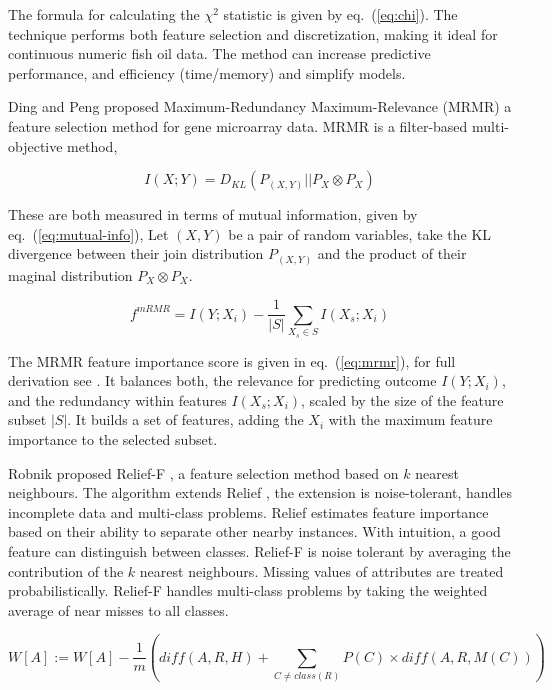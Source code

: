 \documentclass[runningheads]{llncs}
\begin{document}
The formula for calculating the $\chi^2$ statistic is given by eq.~(\ref{eq:chi}).
The technique performs both feature selection and discretization, making it ideal for continuous numeric fish oil data. 
The method can increase predictive performance, and efficiency (time/memory) and simplify models. 

Ding and Peng proposed Maximum-Redundancy Maximum-Relevance (MRMR) \cite{ding2005minimum} a feature selection method for gene microarray data. 
MRMR is a filter-based multi-objective method, 

\begin{equation}
  I(X;Y) = D_{KL}(P_{(X,Y)} || P_X \otimes P_X) 
  \label{eq:mutual-info}
\end{equation}  

These are both measured in terms of mutual information, given by eq.~(\ref{eq:mutual-info}), 
Let $(X,Y)$ be a pair of random variables, take the KL divergence \cite{kullback1951information} between their join distribution $P_{(X,Y)}$ and the product of their maginal distribution $P_X \otimes P_X$.

\begin{equation}
  f^{mRMR} = I(Y;X_i) - \frac{1}{|S|} \sum_{X_s \in S} I(X_s;X_i) 
  \label{eq:mrmr}
\end{equation}  

The MRMR feature importance score is given in eq.~(\ref{eq:mrmr}), for full derivation see \cite{liu1995chi2,zhao2019maximum}.
It balances both, the relevance for predicting outcome $I(Y;X_i)$, and the redundancy within features $I(X_s;X_i)$, scaled by the size of the feature subset $|S|$. 
It builds a set of features, adding the $X_i$ with the maximum feature importance to the selected subset.

Robnik proposed Relief-F \cite{kononenko1994estimating}, a feature selection method based on $k$ nearest neighbours. 
The algorithm extends Relief \cite{kira1992practical}, the extension is noise-tolerant, handles incomplete data and multi-class problems. 
Relief estimates feature importance based on their ability to separate other nearby instances.
With intuition, a good feature can distinguish between classes. 
Relief-F is noise tolerant by averaging the contribution of the $k$ nearest neighbours. 
Missing values of attributes are treated probabilistically\cite{robnik2003theoretical}.
Relief-F handles multi-class problems by taking the weighted average of near misses to all classes.

\begin{equation}
  W[A] := W[A] - \frac{1}{m} \left( diff(A,R,H) +  \sum_{C \ne class(R)} P(C) \times diff(A,R,M(C)) \right)
  \label{eq:reliefF}
\end{equation}
\end{document}
